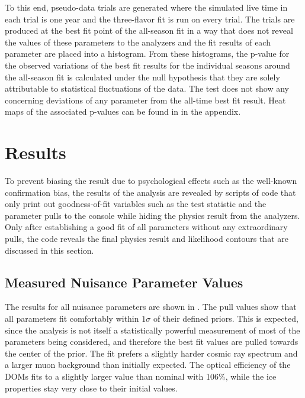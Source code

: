 To this end, pseudo-data trials are generated where the simulated live time in each trial is one year and the three-flavor fit is run on every trial. The trials are produced at the best fit point of the all-season fit in a way that does not reveal the values of these parameters to the analyzers and the fit results of each parameter are placed into a histogram. From these histograms, the p-value for the observed variations of the best fit results for the individual seasons around the all-season fit is calculated under the null hypothesis that they are solely attributable to statistical fluctuations of the data.  The test does not show any concerning deviations of any parameter from the all-time best fit result. Heat maps of the associated p-values can be found in  in the appendix.

\section{Results}

To prevent biasing the result due to psychological effects such as the well-known confirmation bias, the results of the analysis are revealed by scripts of code that only print out goodness-of-fit variables such as the test statistic and the parameter pulls to the console while hiding the physics result from the analyzers.
Only after  establishing a good fit of all parameters without any extraordinary pulls, the code reveals the final physics result and likelihood contours that are discussed in this section.

\subsection{Measured Nuisance Parameter Values}
The results for all nuisance parameters are shown in .
The pull values show that all parameters fit comfortably within $1\sigma$ of their defined priors.
This is expected, since the analysis is not itself a statistically powerful measurement of most of the parameters being considered, and therefore the best fit values are pulled towards the center of the prior.
The fit prefers a slightly harder cosmic ray spectrum and a larger muon background than initially expected.
The optical efficiency of the DOMs fits to a slightly larger value than nominal with 106\%, while the ice properties stay very close to their initial values.


